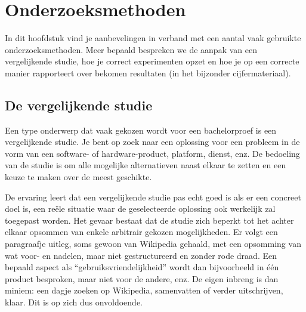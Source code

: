 \chapter{Onderzoeksmethoden}
\label{ch:onderzoeksmethoden}

In dit hoofdstuk vind je aanbevelingen in verband met een aantal vaak gebruikte onderzoeksmethoden. Meer bepaald bespreken we de aanpak van een vergelijkende studie, hoe je correct experimenten opzet en hoe je op een correcte manier rapporteert over bekomen resultaten (in het bijzonder cijfermateriaal).

%
%

\section{De vergelijkende studie}
\label{sec:vergelijkende-studie}

Een type onderwerp dat vaak gekozen wordt voor een bachelorproef is een vergelijkende studie. Je bent op zoek naar een oplossing voor een probleem in de vorm van een software- of hardware-product, platform, dienst, enz. De bedoeling van de studie is om alle mogelijke alternatieven naast elkaar te zetten en een keuze te maken over de meest geschikte.

De ervaring leert dat een vergelijkende studie pas echt goed is als er een concreet doel is, een reële situatie waar de geselecteerde oplossing ook werkelijk zal toegepast worden. Het gevaar bestaat dat de studie zich beperkt tot het achter elkaar opsommen van enkele arbitrair gekozen mogelijkheden. Er volgt een paragraafje uitleg, soms gewoon van Wikipedia gehaald, met een opsomming van wat voor- en nadelen, maar niet gestructureerd en zonder rode draad. Een bepaald aspect als ``gebruiksvriendelijkheid'' wordt dan bijvoorbeeld in één product besproken, maar niet voor de andere, enz. De eigen inbreng is dan miniem: een dagje zoeken op Wikipedia, samenvatten of verder uitschrijven, klaar. Dit is op zich dus onvoldoende.

